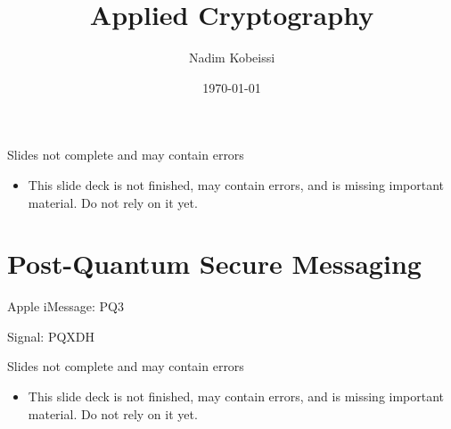 \documentclass[aspectratio=169, lualatex, handout]{beamer}
\title{Applied Cryptography}
\author{Nadim Kobeissi}
\institute{American University of Beirut}
\date{\today}
\begin{document}
\begin{frame}[plain]
	\titlepage
\end{frame}

\begin{frame}{Slides not complete and may contain errors}
	\begin{itemize}
		\item This slide deck is not finished, may contain errors, and is missing important material. Do not rely on it yet.
	\end{itemize}
\end{frame}

\section{Post-Quantum Secure Messaging}
\begin{frame}{Apple iMessage: PQ3}
\end{frame}

\begin{frame}{Signal: PQXDH}
\end{frame}


\begin{frame}{Slides not complete and may contain errors}
	\begin{itemize}
		\item This slide deck is not finished, may contain errors, and is missing important material. Do not rely on it yet.
	\end{itemize}
\end{frame}

\begin{frame}[plain]
	\titlepage
\end{frame}
\end{document}
